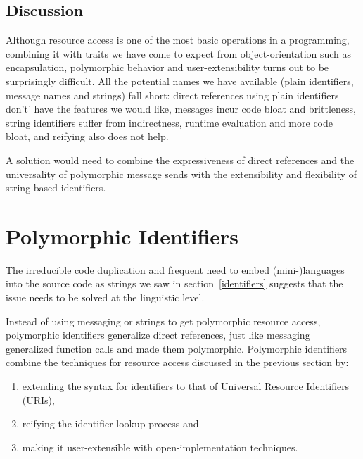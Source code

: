 \documentclass[preprint,authoryear]{acm_proc_article-sp}
\begin{document}
\subsection{Discussion}

Although resource access is one of the most basic operations in a programming, combining it
with traits we have come to expect from object-orientation such as encapsulation, polymorphic
behavior and user-extensibility turns out to be surprisingly difficult.   All the potential names
we have available (plain identifiers, message names and strings) fall short:  direct references
using plain identifiers don't' have the features we would like, messages incur code bloat
and brittleness, string identifiers suffer from indirectness, runtime evaluation and more
code bloat, and reifying also does not help.

A solution would need to combine the expressiveness of direct references and the universality
of polymorphic message sends with the extensibility and flexibility of string-based identifiers.



\section{Polymorphic Identifiers}
\label{polymorphic-identifiers}

The irreducible code duplication and frequent need to embed (mini-)languages into the
source code as strings we saw in section~\ref{identifiers} suggests that the issue needs to be
solved at the linguistic level.

Instead of using messaging or strings to get polymorphic resource access, polymorphic identifiers
generalize direct references,  just like messaging generalized function calls and made them polymorphic.
Polymorphic identifiers combine the techniques for resource access discussed in the previous 
section by:
\begin{enumerate}
\item extending the syntax for identifiers to that of Universal Resource Identifiers (URIs)\cite{rfc3986},
\item reifying the identifier lookup process and
\item making it user-extensible with open-implementation techniques.
\end{enumerate}
\end{document}
